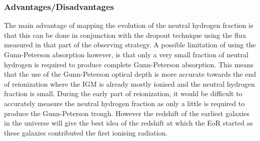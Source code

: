 	\subsubsection{Advantages/Disadvantages} %
	\label{sub:advantages_disadvantages}
		The main advantage of mapping the evolution of the neutral hydrogen fraction is that this can be done in conjunction with the dropout technique using the flux measured in that part of the observing strategy. A possible limitation of using the Gunn-Peterson absorption however, is that only a very small fraction of neutral hydrogen is required to produce complete Gunn-Peterson absorption. This means that the use of the Gunn-Peterson optical depth is more accurate towards the end of reionization where the IGM is already mostly ionised and the neutral hydrogen fraction is small. During the early part of reionization, it would be difficult to accurately measure the neutral hydrogen fraction as only a little is required to produce the Gunn-Peterson trough. However the redshift of the earliest galaxies in the universe will give the best idea of the redshift at which the EoR started as these galaxies contributed the first ionising radiation.
